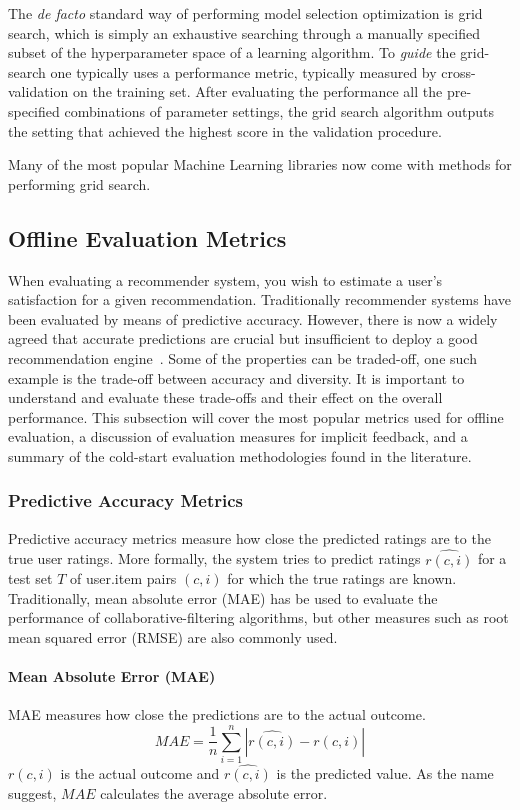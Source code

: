 The \emph{de facto} standard way of performing model selection optimization is grid search, which is simply an exhaustive searching through a manually specified subset of the hyperparameter space of a learning algorithm. To \emph{guide} the grid-search one typically uses a performance metric, typically measured by cross-validation on the training set. After evaluating the performance all the pre-specified combinations of parameter settings, the grid search algorithm outputs the setting that achieved the highest score in the validation procedure.

Many of the most popular Machine Learning libraries now come with methods for performing grid search.

\subsection{Offline Evaluation Metrics}
When evaluating a recommender system, you wish to estimate a user's
satisfaction for a given recommendation. Traditionally recommender systems have
been evaluated by means of predictive accuracy. However, there is now a widely
agreed that accurate predictions are crucial but insufficient to deploy a good
recommendation engine~\cite{Shani2011, McNee2006}. Some of the properties can
be traded-off, one such example is the trade-off between accuracy and
diversity. It is important to understand and evaluate these trade-offs and
their effect on the overall performance. This subsection will cover the most
popular metrics used for offline evaluation, a discussion of evaluation
measures for implicit feedback, and a summary of the cold-start evaluation
methodologies found in the literature.

\subsubsection{Predictive Accuracy Metrics}
Predictive accuracy metrics measure how close the predicted ratings are to the
true user ratings. More formally, the system tries to predict ratings
$\hat{r(c,i)}$ for a test set $T$ of user.item pairs $(c, i)$ for which the
true ratings are known. Traditionally, mean absolute error (MAE) has be used to
evaluate the performance of collaborative-filtering algorithms, but other
measures such as root mean squared error (RMSE) are also commonly used.

\paragraph{Mean Absolute Error (MAE)}
MAE measures how close the predictions are to the actual outcome.
\begin{equation}
    MAE = \frac{1}{n}\sum_{i=1}^{n}{|\hat{r(c,i)}-r(c,i)|}
    \label{equation:mae}
\end{equation}
$r(c,i)$ is the actual outcome and $\hat{r(c,i)}$ is the predicted value.
As the name suggest, $MAE$ calculates the average absolute error.

